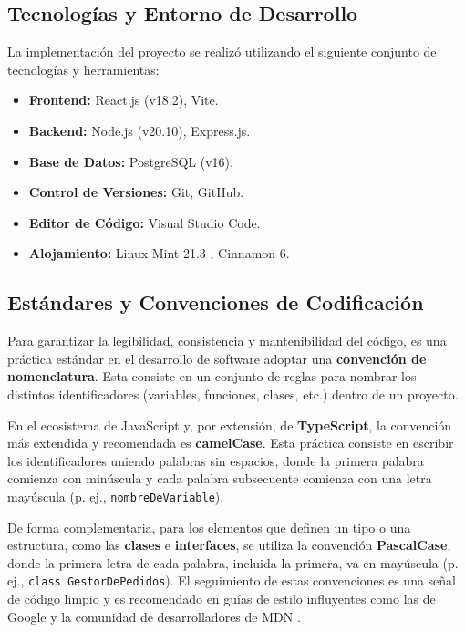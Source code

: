 \documentclass[12pt,letterpaper,spanish]{report}
\begin{document}
\subsection{Tecnologías y Entorno de Desarrollo}
\label{sec:tecnologias_entorno}

La implementación del proyecto se realizó utilizando el siguiente conjunto de tecnologías y herramientas:
\begin{itemize}
    \item \textbf{Frontend:} React.js (v18.2), Vite.
    \item \textbf{Backend:} Node.js (v20.10), Express.js.
    \item \textbf{Base de Datos:} PostgreSQL (v16).
    \item \textbf{Control de Versiones:} Git, GitHub.
    \item \textbf{Editor de Código:} Visual Studio Code.
    \item \textbf{Alojamiento:} Linux Mint 21.3 , Cinnamon 6.
\end{itemize}


\subsection{Estándares y Convenciones de Codificación}
\label{sec:estandares_codigo}

Para garantizar la legibilidad, consistencia y mantenibilidad del código, es una práctica estándar en el desarrollo de software adoptar una \textbf{convención de nomenclatura}. Esta consiste en un conjunto de reglas para nombrar los distintos identificadores (variables, funciones, clases, etc.) dentro de un proyecto.

En el ecosistema de JavaScript y, por extensión, de \textbf{TypeScript}, la convención más extendida y recomendada es \textbf{camelCase}. Esta práctica consiste en escribir los identificadores uniendo palabras sin espacios, donde la primera palabra comienza con minúscula y cada palabra subsecuente comienza con una letra mayúscula (p. ej., \texttt{nombreDeVariable}).

De forma complementaria, para los elementos que definen un tipo o una estructura, como las \textbf{clases} e \textbf{interfaces}, se utiliza la convención \textbf{PascalCase}, donde la primera letra de cada palabra, incluida la primera, va en mayúscula (p. ej., \texttt{class GestorDePedidos}). El seguimiento de estas convenciones es una señal de código limpio y es recomendado en guías de estilo influyentes como las de Google y la comunidad de desarrolladores de MDN \citep{GoogleTSGuide, MDNGlossaryCamelCase}.
\end{document}
